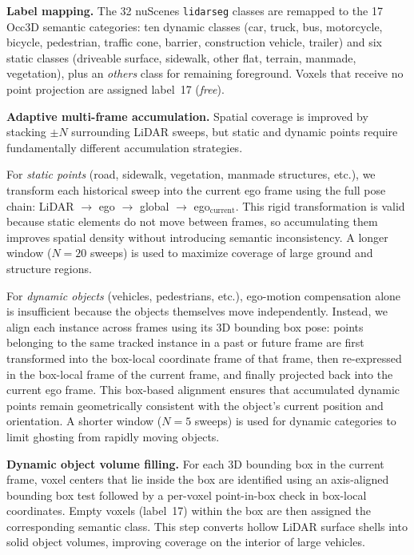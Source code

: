 \documentclass[conference]{IEEEtran}
\begin{document}
\textbf{Label mapping.} The 32 nuScenes \texttt{lidarseg} classes are remapped to the 17 Occ3D semantic categories: ten dynamic classes (car, truck, bus, motorcycle, bicycle, pedestrian, traffic cone, barrier, construction vehicle, trailer) and six static classes (driveable surface, sidewalk, other flat, terrain, manmade, vegetation), plus an \emph{others} class for remaining foreground. Voxels that receive no point projection are assigned label~17 (\emph{free}).

\textbf{Adaptive multi-frame accumulation.} Spatial coverage is improved by stacking $\pm N$ surrounding LiDAR sweeps, but static and dynamic points require fundamentally different accumulation strategies.

For \emph{static points} (road, sidewalk, vegetation, manmade structures, etc.), we transform each historical sweep into the current ego frame using the full pose chain: LiDAR $\to$ ego $\to$ global $\to$ ego$_{\text{current}}$. This rigid transformation is valid because static elements do not move between frames, so accumulating them improves spatial density without introducing semantic inconsistency. A longer window ($N = 20$ sweeps) is used to maximize coverage of large ground and structure regions.

For \emph{dynamic objects} (vehicles, pedestrians, etc.), ego-motion compensation alone is insufficient because the objects themselves move independently. Instead, we align each instance across frames using its 3D bounding box pose: points belonging to the same tracked instance in a past or future frame are first transformed into the box-local coordinate frame of that frame, then re-expressed in the box-local frame of the current frame, and finally projected back into the current ego frame. This box-based alignment ensures that accumulated dynamic points remain geometrically consistent with the object's current position and orientation. A shorter window ($N = 5$ sweeps) is used for dynamic categories to limit ghosting from rapidly moving objects.

\textbf{Dynamic object volume filling.} For each 3D bounding box in the current frame, voxel centers that lie inside the box are identified using an axis-aligned bounding box test followed by a per-voxel point-in-box check in box-local coordinates. Empty voxels (label~17) within the box are then assigned the corresponding semantic class. This step converts hollow LiDAR surface shells into solid object volumes, improving coverage on the interior of large vehicles.
\end{document}
